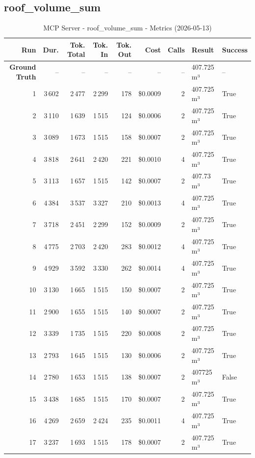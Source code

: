 \documentclass[a4paper,11pt]{article}
\begin{document}
\clearpage
\subsection{roof\_volume\_sum}

\begin{table}[ht]
\centering
\scriptsize
\caption{MCP Server - roof\_volume\_sum - Metrics (2026-05-13)}
\label{tab:mcp\_roof\_volume\_sum\_metrics\_2026-05-13}
\begin{tabular}{r r r r r r r p{3cm} l}
\hline
Run & Dur. & Tok. Total & Tok. In & Tok. Out & Cost & Calls & Result & Success \\
\hline
\textbf{Ground Truth} & -- & -- & -- & -- & -- & -- & 407.725 m³ & -- \\
\hline
1 & 3\,602 & 2\,477 & 2\,299 & 178 & \$0.0009 & 2 & 407.725 m³ & True \\
2 & 3\,110 & 1\,639 & 1\,515 & 124 & \$0.0006 & 2 & 407.725 m³ & True \\
3 & 3\,089 & 1\,673 & 1\,515 & 158 & \$0.0007 & 2 & 407.725 m³ & True \\
4 & 3\,818 & 2\,641 & 2\,420 & 221 & \$0.0010 & 4 & 407.725 m³ & True \\
5 & 3\,113 & 1\,657 & 1\,515 & 142 & \$0.0007 & 2 & 407.73 m³ & True \\
6 & 4\,384 & 3\,537 & 3\,327 & 210 & \$0.0013 & 4 & 407.725 m³ & True \\
7 & 3\,718 & 2\,451 & 2\,299 & 152 & \$0.0009 & 2 & 407.725 m³ & True \\
8 & 4\,775 & 2\,703 & 2\,420 & 283 & \$0.0012 & 4 & 407.725 m³ & True \\
9 & 4\,929 & 3\,592 & 3\,330 & 262 & \$0.0014 & 4 & 407.725 m³ & True \\
10 & 3\,130 & 1\,665 & 1\,515 & 150 & \$0.0007 & 2 & 407.725 m³ & True \\
11 & 2\,900 & 1\,655 & 1\,515 & 140 & \$0.0007 & 2 & 407.725 m³ & True \\
12 & 3\,339 & 1\,735 & 1\,515 & 220 & \$0.0008 & 2 & 407.725 m³ & True \\
13 & 2\,793 & 1\,645 & 1\,515 & 130 & \$0.0006 & 2 & 407.725 m³ & True \\
14 & 2\,780 & 1\,653 & 1\,515 & 138 & \$0.0007 & 2 & 407725 m³ & False \\
15 & 3\,438 & 1\,685 & 1\,515 & 170 & \$0.0007 & 2 & 407.725 m³ & True \\
16 & 4\,269 & 2\,659 & 2\,424 & 235 & \$0.0011 & 4 & 407.725 m³ & True \\
17 & 3\,237 & 1\,693 & 1\,515 & 178 & \$0.0007 & 2 & 407.725 m³ & True \\

\end{tabular}
\end{table}
\end{document}
